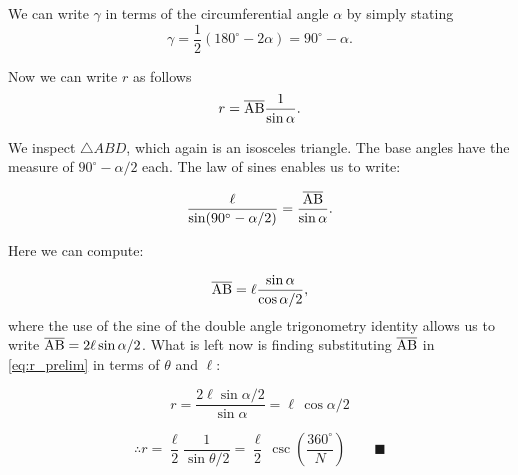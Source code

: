 \documentclass{article}
\begin{document}
We can write $\gamma$ in terms of the circumferential angle $\alpha$ by simply stating
\begin{equation}
    \gamma = \frac{1}{2} (180^\circ - 2\alpha) = 90^\circ - \alpha.
\end{equation}

Now we can write $r$ as follows
\begin{equation}
\label{eq:r_prelim}
r = \overline{\rm AB} \frac{1}{\sin \alpha}. \\ 
\end{equation}

We inspect $\triangle ABD$, which again is an isosceles triangle.  The base angles have the measure of $90^\circ - \alpha / 2$ each.  The law of sines enables us to write:

\begin{equation}
    \frac{\ell}{\sin(90^\circ - \alpha / 2)}  = \frac{\overline{\rm AB}}{\sin \alpha}.
\end{equation}

Here we can compute:

\begin{equation}
    \overline{\rm AB} =  \ell \frac{\sin \alpha}{\cos \alpha/2},
\end{equation}
where the use of the sine of the double angle trigonometry identity allows us to write $\overline{\rm AB} = 2\ell \sin \alpha/2$.  What is left now is finding substituting $\overline{\rm AB}$ in \eqref{eq:r_prelim} in terms of $\theta$ and $\ell$:

\begin{equation}
r = \frac{2 \ell \sin \alpha / 2}{\sin \alpha} = {\ell}\,{\cos \alpha / 2}
\end{equation}

\begin{equation}
\therefore r = \frac{\ell}{2} \frac{1}{\sin \theta /2} = \frac{\ell}{2}\, \csc \left ( \frac{360^\circ}{N} \right ) \qquad \blacksquare
\end{equation}
\end{document}
